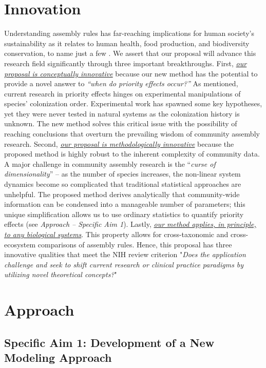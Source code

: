 \documentclass[12pt, class=article, crop=false]{standalone}
\begin{document}
\section{Innovation}
Understanding assembly rules has far-reaching implications for human society's sustainability as it relates to human health, food production, and biodiversity conservation, to name just a few \citep{fukami_historical_2015}.
We assert that our proposal will advance this research field significantly through three important breakthroughs.
First, \ul{\emph{our proposal is conceptually innovative}} because our new method has the potential to provide a novel answer to \textit{``when do priority effects occur?''}
As mentioned, current research in priority effects hinges on experimental manipulations of species' colonization order.
Experimental work has spawned some key hypotheses, yet they were never tested in natural systems as the colonization history is unknown. 
The new method solves this critical issue with the possibility of reaching conclusions that overturn the prevailing wisdom of community assembly research.
Second, \ul{\emph{our proposal is methodologically innovative}} because the proposed method is highly robust to the inherent complexity of community data.
A major challenge in community assembly research is the ``\textit{curse of dimensionality}'' -- as the number of species increases, the non-linear system dynamics become so complicated that traditional statistical approaches are unhelpful.
The proposed method derives analytically that community-wide information can be condensed into a manageable number of parameters; this unique simplification allows us to use ordinary statistics to quantify priority effects (see \textit{Approach -- Specific Aim 1}).
Lastly, \ul{\emph{our method applies, in principle, to any biological systems}}.
This property allows for cross-taxonomic and cross-ecosystem comparisons of assembly rules.
Hence, this proposal has three innovative qualities that meet the NIH review criterion "\emph{Does the application challenge and seek to shift current research or clinical practice paradigms by utilizing novel theoretical concepts?}"

\section{Approach}

\subsection*{Specific Aim 1: Development of a New Modeling Approach}
\end{document}
